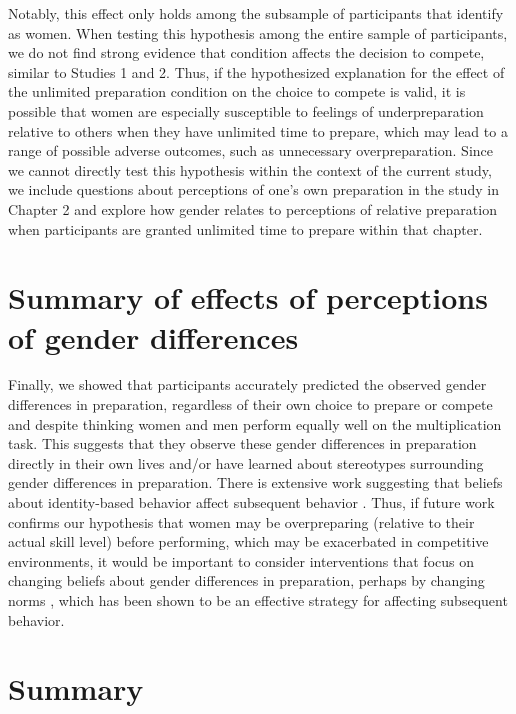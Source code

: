 \documentclass[a4paper,nobind]{templates/ociamthesis}
\begin{document}
Notably, this effect only holds among the subsample of participants that identify as women. When testing this hypothesis among the entire sample of participants, we do not find strong evidence that condition affects the decision to compete, similar to Studies 1 and 2. Thus, if the hypothesized explanation for the effect of the unlimited preparation condition on the choice to compete is valid, it is possible that women are especially susceptible to feelings of underpreparation relative to others when they have unlimited time to prepare, which may lead to a range of possible adverse outcomes, such as unnecessary overpreparation. Since we cannot directly test this hypothesis within the context of the current study, we include questions about perceptions of one's own preparation in the study in Chapter 2 and explore how gender relates to perceptions of relative preparation when participants are granted unlimited time to prepare within that chapter.

\hypertarget{summary-of-effects-of-perceptions-of-gender-differences}{%
\section{Summary of effects of perceptions of gender differences}\label{summary-of-effects-of-perceptions-of-gender-differences}}

Finally, we showed that participants accurately predicted the observed gender differences in preparation, regardless of their own choice to prepare or compete and despite thinking women and men perform equally well on the multiplication task. This suggests that they observe these gender differences in preparation directly in their own lives and/or have learned about stereotypes surrounding gender differences in preparation. There is extensive work suggesting that beliefs about identity-based behavior affect subsequent behavior \autocite{Babcock2012,Bowles2007,Toosi2019,Smith2014,Benjamin2010c,Bertrand2015,Akerlof2000}. Thus, if future work confirms our hypothesis that women may be overpreparing (relative to their actual skill level) before performing, which may be exacerbated in competitive environments, it would be important to consider interventions that focus on changing beliefs about gender differences in preparation, perhaps by changing norms \autocite{Miller2016}, which has been shown to be an effective strategy for affecting subsequent behavior.

\hypertarget{summary}{%
\section{Summary}\label{summary}}
\end{document}
